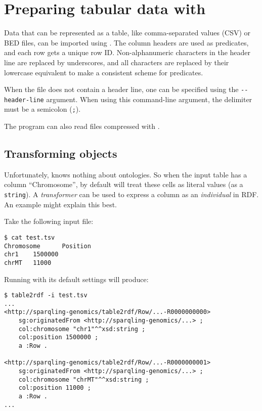 \section{Preparing tabular data with }
\label{sec:table2rdf}

  Data that can be represented as a table, like comma-separated values (CSV)
  or BED files, can be imported using .  The column headers
  are used as predicates, and each row gets a unique row ID.  Non-alphanumeric
  characters in the header line are replaced by underscores, and all characters
  are replaced by their lowercase equivalent to make a consistent scheme for
  predicates.

  When the file does not contain a header line, one can be specified using the
  \texttt{-{}-header-line} argument.  When using this command-line argument, the
  delimiter must be a semicolon (\texttt{;}).

  The program can also read files compressed with .

\subsection{Transforming objects}

  Unfortunately,  knows nothing about ontologies.  So when
  the input table has a column ``Chromosome'', by default 
  will treat these cells as literal values (as a \texttt{string}).  A
  \emph{transformer} can be used to express a column as an \emph{individual} in
  RDF.  An example might explain this best.

  Take the following input file:
\begin{siderules}
\begin{verbatim}
$ cat test.tsv
Chromosome      Position
chr1    1500000
chrMT   11000
\end{verbatim}
\end{siderules}

  Running  with its default settings will produce:

\begin{siderules}
\begin{verbatim}
$ table2rdf -i test.tsv
...
<http://sparqling-genomics/table2rdf/Row/...-R0000000000>
    sg:originatedFrom <http://sparqling-genomics/...> ;
    col:chromosome "chr1"^^xsd:string ;
    col:position 1500000 ;
    a :Row .

<http://sparqling-genomics/table2rdf/Row/...-R0000000001>
    sg:originatedFrom <http://sparqling-genomics/...> ;
    col:chromosome "chrMT"^^xsd:string ;
    col:position 11000 ;
    a :Row .
...
\end{verbatim}
\end{siderules}

